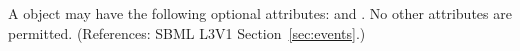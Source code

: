 A \Delay object may have the following optional attributes:
 and .  
No other attributes are permitted.  
(References: SBML L3V1 Section~\ref{sec:events}.)
